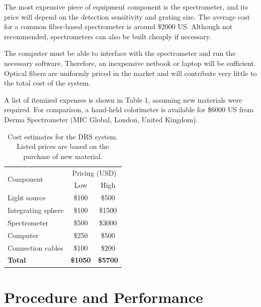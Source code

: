 The most expensive piece of equipment component is the spectrometer, and its price will depend on the detection sensitivity and grating size. The average cost for a common fiber-based spectrometer is around \$2000 US. Although not recommended, spectrometers can also be built cheaply if necessary.\cite{Sumriddetchkajorn2012}

The computer must be able to interface with the spectrometer and run the necessary software. Therefore, an inexpensive netbook or laptop will be sufficient. Optical fibers are uniformly priced in the market and will contribute very little to the total cost of the system.

A list of itemized expenses is shown in Table 1, assuming new materials were required. For comparison, a hand-held colorimeter is available for \$6000 US from Derma Spectrometer (MIC Global, London, United Kingdom).

\begin{table}[h]
	\centering
	\caption{Cost estimates for the DRS system. Listed prices are based on the purchase of new material.}
	\label{my-label}
	\begin{tabular}{lcc}
		\toprule
		\multirow{2}{*}{Component} & \multicolumn{2}{c}{Pricing (USD)} \\ \cmidrule(l){2-3} 
		& Low             & High            \\ \midrule
		Light source               & \$100           & \$500           \\
		Integrating sphere\qquad\qquad         & \$100           & \$1500          \\
		Spectrometer               & \$500           & \$3000          \\
		Computer                   & \$250           & \$500           \\
		Connection cables\qquad\qquad          & \$100           & \$200           \\
		\textbf{Total}             & \textbf{\qquad\$1050\qquad} & \textbf{\qquad\$5700\qquad} \\ \bottomrule
	\end{tabular}
\end{table}

\section{Procedure and Performance}

